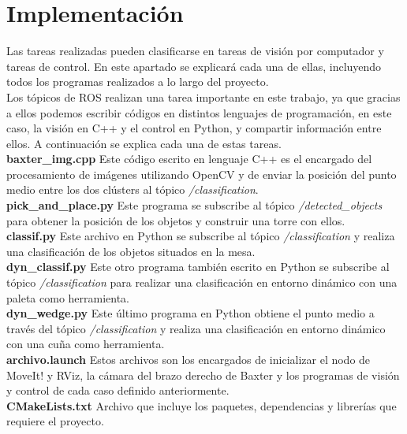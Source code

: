 \section{Implementación}
\noindent Las tareas realizadas pueden clasificarse en tareas de visión por computador y tareas de control. En este apartado se explicará cada una de ellas, incluyendo todos los programas realizados a lo largo del proyecto. \\

\noindent Los tópicos de ROS realizan una tarea importante en este trabajo, ya que gracias a ellos podemos escribir códigos en distintos lenguajes de programación, en este caso, la visión en C++ y el control en Python, y compartir información entre ellos. A continuación se explica cada una de estas tareas. \\

\textbf{baxter\_img.cpp} Este código escrito en lenguaje C++ es el encargado del procesamiento de imágenes utilizando OpenCV y de enviar la posición del punto medio entre los dos clústers al tópico \textit{/classification}.\\

\textbf{pick\_and\_place.py} Este programa se subscribe al tópico \textit{/detected\_objects} para obtener la posición de los objetos y construir una torre con ellos. \\

\textbf{classif.py} Este archivo en Python se subscribe al tópico \textit{/classification} y realiza una clasificación de los objetos situados en la mesa. \\

\textbf{dyn\_classif.py} Este otro programa también escrito en Python se subscribe al tópico \textit{/classification} para realizar una clasificación en entorno dinámico con una paleta como herramienta. \\

\textbf{dyn\_wedge.py} Este último programa en Python obtiene el punto medio a través del tópico \textit{/classification} y realiza una clasificación en entorno dinámico con una cuña como herramienta.\\

\textbf{archivo.launch} Estos archivos son los encargados de inicializar el nodo de MoveIt! y RViz, la cámara del brazo derecho de Baxter y los programas de visión y control de cada caso definido anteriormente. \\ 

\textbf{CMakeLists.txt} Archivo que incluye los paquetes, dependencias y librerías que requiere el proyecto. \\

